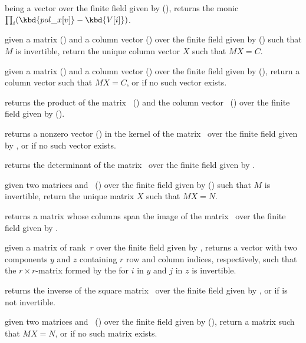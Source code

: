  being a vector over the finite field given by  (),
returns the monic  $\prod_i (\kbd{pol\_x[v]} - \kbd{V[i]})$.


 given a matrix 
() and a column vector  () over the finite
field given by  () such that $M$ is invertible,
return the unique column vector $X$ such that $MX=C$.

 given a matrix
 () and a column vector  () over the
finite field given by  (), return a column vector
 such that $MX=C$, or  if no such vector exists.

 returns the product of
the matrix~ () and the column vector~
() over the finite field given by  ().

 returns a nonzero vector
() in the kernel of the matrix~ over the finite field
given by , or  if no such vector exists.

 returns the determinant of the
matrix~ over the finite field given by .

 given two matrices 
and~ () over the finite field given by 
() such that $M$ is invertible, return the unique matrix
$X$ such that $MX=N$.

 returns a matrix whose columns
span the image of the matrix~ over the finite field given by
.

 given a matrix  of
rank~$r$ over the finite field given by , returns a vector
with two  components $y$ and $z$ containing $r$ row and
column indices, respectively, such that the $r\times r$-matrix formed
by the  for $i$ in $y$ and $j$ in $z$ is invertible.

 returns the inverse of the square
matrix~ over the finite field given by , or 
if  is not invertible.

 given two matrices
 and~ () over the finite field given by
 (), return a matrix  such that $MX=N$, or
 if no such matrix exists.

